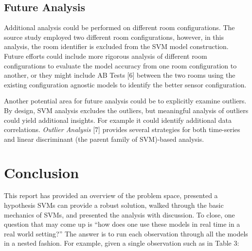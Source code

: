 \documentclass[
]{article}
\begin{document}
\subsection{Future Analysis}\label{future-analysis}

Additional analysis could be performed on different room configurations.
The source study employed two different room configurations, however, in
this analysis, the room identifier is excluded from the SVM model
construction. Future efforts could include more rigorous analysis of
different room configurations to evaluate the model accuracy from one
room configuration to another, or they might include AB Tests {[}6{]}
between the two rooms using the existing configuration agnostic models
to identify the better sensor configuration.

Another potential area for future analysis could be to explicitly
examine outliers. By design, SVM analysis excludes the outliers, but
meaningful analysis of outliers could yield additional insights. For
example it could identify additional data correlations. \emph{Outlier
Analysis} {[}7{]} provides several strategies for both time-series and
linear discriminant (the parent family of SVM)-based analysis.

\newpage

\section{Conclusion}\label{conclusion}

This report has provided an overview of the problem space, presented a
hypothesis SVMs can provide a robust solution, walked through the basic
mechanics of SVMs, and presented the analysis with discussion. To close,
one question that may come up is ``how does one use these models in real
time in a real world setting?'' The answer is to run each observation
through all the models in a nested fashion. For example, given a single
observation such as in Table 3:
\end{document}
